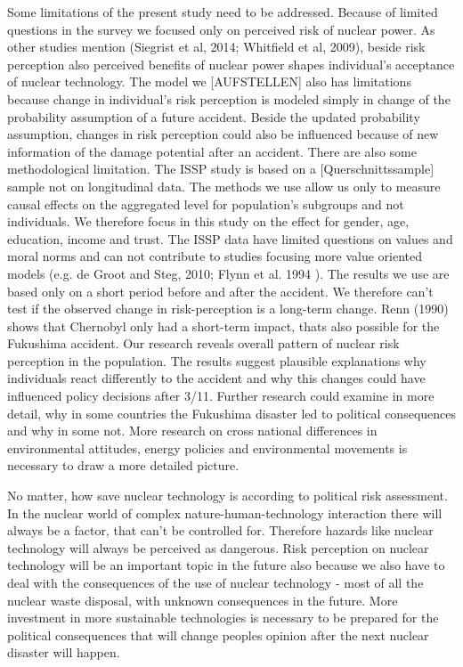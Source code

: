                                

Some limitations of the present study need to be addressed. Because of limited questions in the survey  we focused only on perceived risk of nuclear power. As other studies mention (Siegrist et al, 2014; Whitfield et al, 2009), beside risk perception also perceived benefits of nuclear power shapes individual's acceptance of nuclear technology. The model we [AUFSTELLEN] also has limitations because  change in individual's risk perception is modeled simply in change of the probability assumption of a future accident. Beside the updated probability assumption, changes in risk perception could also be influenced because of new information of the damage potential after an accident. There are also some methodological limitation.  The ISSP study is based on a [Querschnittssample] sample not on longitudinal data. The methods we use allow us only to measure causal effects on the aggregated level for population's subgroups and not individuals. We therefore focus in this study on the effect for gender, age, education, income and trust. The ISSP data have limited questions on values and moral norms and can not contribute to studies focusing more value oriented models (e.g. de Groot and Steg, 2010; Flynn et al. 1994  \citep{deGroot:2010ez}). The results we use are based only on a short period before and after the accident. We therefore can't test if the observed change in risk-perception is a long-term change. Renn (1990) shows that Chernobyl only had a short-term impact, thats also possible for the Fukushima accident. Our research reveals overall pattern of nuclear risk perception in the population. The results suggest plausible explanations why individuals react differently to the accident and why this changes could have influenced policy decisions after 3/11.  Further research could examine in more detail, why in some countries the Fukushima disaster led to political consequences and why in some not. More research on cross national differences in environmental attitudes, energy policies and environmental movements is necessary to draw a more detailed picture. 
             

No matter, how save nuclear technology is according to political risk assessment. In the nuclear world of complex nature-human-technology interaction there will always be a factor, that can't be controlled for. Therefore hazards like nuclear technology will always be perceived as dangerous. Risk perception on nuclear technology will be an important topic in the future also because we also have to deal with the consequences of the use of nuclear technology - most of all the nuclear waste disposal, with unknown consequences in the future. More investment in more sustainable technologies is necessary to be prepared for the political consequences that will change peoples opinion after the next nuclear disaster will happen. 
 
